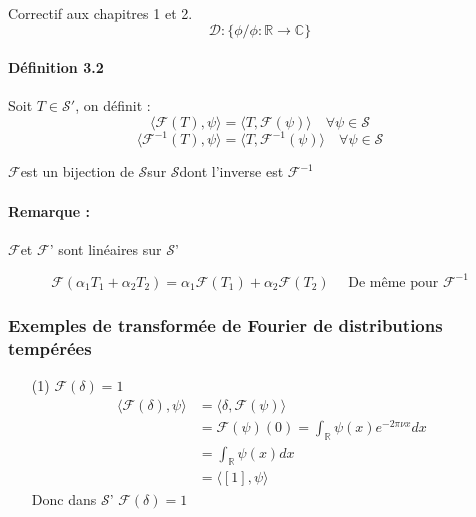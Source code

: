 \documentclass[12pt,a4paper]{report}
\newcommand{\ens}[1]{\ensuremath{\mathbb{#1}}}
\newcommand{\D}{\ensuremath{\mathcal{D}}}
\newcommand{\F}{\ensuremath{\mathcal{F}}}
\newcommand{\Sf}{\ensuremath{\mathcal{S}}}
\begin{document}
Correctif aux chapitres 1 et 2.
\[
	\D : \{ \phi / \phi: \ens{R} \rightarrow \ens{C} \}
\]

\paragraph{Définition 3.2} Soit \(T \in \Sf'\), on définit :
\[
	\langle \F(T), \psi \rangle = \langle T, \F(\psi) \rangle \quad \forall \psi \in \Sf
\]
\[
	\langle \F^{-1}(T), \psi \rangle = \langle T, \F^{-1}(\psi) \rangle \quad \forall \psi \in \Sf
\]

\F est un bijection de \Sf sur \Sf dont l'inverse est $\F^{-1}$

\paragraph{Remarque :} \F et \F' sont linéaires sur \Sf'

\[
	\F(\alpha_1 T_1 + \alpha_2 T_2 ) = \alpha_1 \F(T_1) + \alpha_2 \F(T_2) \quad \text{ De même pour } \F^{-1}
\]

\subsubsection{Exemples de transformée de Fourier de distributions tempérées}

\begin{itemize}
	\item[(1)] \(\F(\delta) = 1\)
	\begin{align*}
		\langle \F(\delta), \psi \rangle &= \langle \delta, \F(\psi) \rangle\\
		&= \F(\psi)(0) = \int_{\ens{R}} \psi(x) e^{-2\pi \nu x}dx\\
		&= \int_{\ens{R}} \psi(x) dx\\
		&= \langle [1], \psi \rangle
	\end{align*}
	Donc dans \Sf' \(\F(\delta) = 1\)
\end{itemize}
\end{document}
